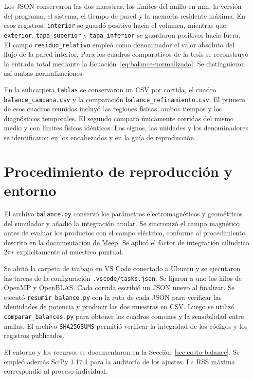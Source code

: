 Los JSON conservaron las dos muestras, los límites del anillo en mm, la versión del programa, el sistema, el tiempo de pared y la memoria residente máxima. En esos registros, \texttt{interior} se guardó positivo hacia el volumen, mientras que \texttt{exterior}, \texttt{tapa\_superior} y \texttt{tapa\_inferior} se guardaron positivos hacia fuera. El campo \texttt{residuo\_relativo} empleó como denominador el valor absoluto del flujo de la pared interior. Para los cuadros comparativos de la tesis se reconstruyó la entrada total mediante la Ecuación~\ref{eq:balance-normalizado}. Se distinguieron así ambas normalizaciones.

En la subcarpeta \texttt{tablas} se conservaron un CSV por corrida, el cuadro \texttt{balance\_campana.csv} y la comparación \texttt{balance\_refinamiento.csv}. El primero de esos cuadros reunidos incluyó las regiones físicas, ambos tiempos y los diagnósticos temporales. El segundo comparó únicamente corridas del mismo medio y con límites físicos idénticos. Los signos, las unidades y los denominadores se identificaron en los encabezados y en la guía de reproducción.

\section{Procedimiento de reproducción y entorno}
El archivo \texttt{balance.py} conservó los parámetros electromagnéticos y geométricos del simulador y añadió la integración anular. Se sincronizó el campo magnético antes de evaluar los productos con el campo eléctrico, conforme al procedimiento descrito en la \href{https://meep.readthedocs.io/en/latest/Synchronizing_the_Magnetic_and_Electric_Fields/}{documentación de Meep}. Se aplicó el factor de integración cilíndrico $2\pi r$ explícitamente al muestreo puntual.

Se abrió la carpeta de trabajo en VS Code conectado a Ubuntu y se ejecutaron las tareas de la configuración \texttt{.vscode/tasks.json}. Se fijaron a uno los hilos de OpenMP y OpenBLAS. Cada corrida escribió un JSON nuevo al finalizar. Se ejecutó \texttt{resumir\_balance.py} con la ruta de cada JSON para verificar las identidades de potencia y producir las dos muestras en CSV. Luego se utilizó \texttt{comparar\_balances.py} para obtener los cuadros comunes y la sensibilidad entre mallas. El archivo \texttt{SHA256SUMS} permitió verificar la integridad de los códigos y los registros publicados.

El entorno y los recursos se documentaron en la Sección~\ref{sec:costo-balance}. Se empleó además SciPy 1.17.1 para la auditoría de los ajustes. La RSS máxima correspondió al proceso individual.

